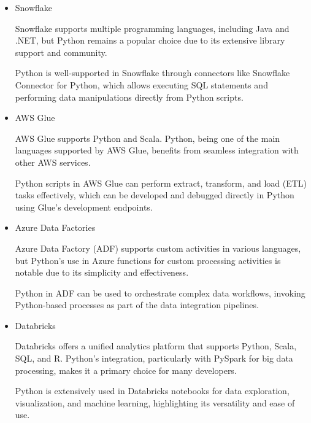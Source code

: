 \begin{itemize}
\item  Snowflake

Snowflake supports multiple programming languages, including Java and .NET, but Python remains a popular choice due to its extensive library support and community.

Python is well-supported in Snowflake through connectors like Snowflake Connector for Python, which allows executing SQL statements and performing data manipulations directly from Python scripts.


\item AWS Glue

    AWS Glue supports Python and Scala. Python, being one of the main languages supported by AWS Glue, benefits from seamless integration with other AWS services.
    
    Python scripts in AWS Glue can perform extract, transform, and load (ETL) tasks effectively, which can be developed and debugged directly in Python using Glue’s development endpoints.


    \item Azure Data Factories

    Azure Data Factory (ADF) supports custom activities in various languages, but Python’s use in Azure functions for custom processing activities is notable due to its simplicity and effectiveness.
   
    Python in ADF can be used to orchestrate complex data workflows, invoking Python-based processes as part of the data integration pipelines.


    \item Databricks

    Databricks offers a unified analytics platform that supports Python, Scala, SQL, and R. Python’s integration, particularly with PySpark for big data processing, makes it a primary choice for many developers.

    Python is extensively used in Databricks notebooks for data exploration, visualization, and machine learning, highlighting its versatility and ease of use.

\end{itemize}


